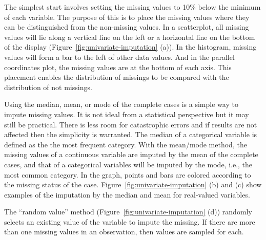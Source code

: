 \documentclass[article]{jss}
\begin{document}
The simplest start involves setting the missing values to 10\% below the minimum of each variable. The purpose of this is to place the missing values where they can be distinguished from the non-missing values. In a scatterplot, all missing values will lie along a vertical line on the left or a horizontal line on the bottom of the display (Figure~\ref{fig:univariate-imputation} (a)). In the histogram, missing values will form a bar to the left of other data values. And in the parallel coordinates plot, the missing values are at the bottom of each axis. This placement enables the distribution of missings to be compared with the distribution of not missings.

Using the median, mean, or mode of the complete cases is a simple way to impute missing values. It is not ideal from a statistical perspective but it may still be practical. There is less room for catastrophic errors and if results are not affected then the simplicity is warranted. The median of a categorical variable is defined as the the most frequent category. With the mean/mode method, the missing values of a continuous variable are imputed by the mean of the complete cases, and that of a categorical variables will be imputed by the mode, i.e., the most common category. In the graph, points and bars are colored according to the missing status of the case. Figure~\ref{fig:univariate-imputation} (b) and (c) show examples of the imputation by the median and mean for real-valued variables.

The ``random value'' method (Figure~\ref{fig:univariate-imputation} (d)) randomly selects an existing value of the variable to impute the missing. If there are more than one missing values in an observation, then values are sampled for each.
\end{document}
